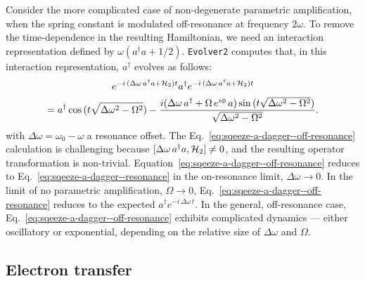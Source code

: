 Consider the more complicated case of non-degenerate parametric amplification, when the spring constant is modulated off-resonance at frequency $2 \omega$.
To remove the time-dependence in the resulting Hamiltonian, we need an interaction representation defined by $\omega (a^{\dagger} a + 1/2)$.
\verb+Evolver2+ computes that, in this interaction representation, $a^{\dagger}$ evolves as follows:
\begin{multline}
e^{-i \, (\Delta \omega \, a^{\dagger} a +  {\cal H}_2)  t}  
a^{\dagger} 
e^{-i \, (\Delta \omega \, a^{\dagger} a +  {\cal H}_2)  t}  
\\
= a^{\dagger} \cos{(t \sqrt{\Delta \omega^2 - \Omega^2})}
   - \frac{i (\Delta \omega \, a^{\dagger} + \Omega \, e^{i \phi}  \, a) \sin{(t \sqrt{\Delta \omega^2 - \Omega^2})}}
            {\sqrt{\Delta \omega^2 - \Omega^2}}.
\label{eq:sqeeze-a-dagger--off-resonance}
\end{multline}
with $\Delta \omega = \omega_0 - \omega$ a resonance offset.
The Eq.~\ref{eq:sqeeze-a-dagger--off-resonance} calculation is challenging because $[\Delta \omega \, a^{\dagger} a, {\cal H}_2] \neq 0$, and the resulting operator transformation is non-trivial.
Equation~\ref{eq:sqeeze-a-dagger--off-resonance} reduces to Eq.~\ref{eq:sqeeze-a-dagger--resonance} in the on-resonance limit, $\Delta \omega \rightarrow 0$.
In the limit of no parametric amplification, $\Omega \rightarrow 0$, Eq.~\ref{eq:sqeeze-a-dagger--off-resonance} reduces to the expected $a^{\dagger} e^{-i \, \Delta \omega \, t}$.
In the general, off-resonance case, Eq.~\ref{eq:sqeeze-a-dagger--off-resonance} exhibits complicated dynamics ---  either oscillatory or exponential, depending on the relative size of $\Delta \omega$ and $\Omega$.


\subsection{Electron transfer}
\label{sec:et}

